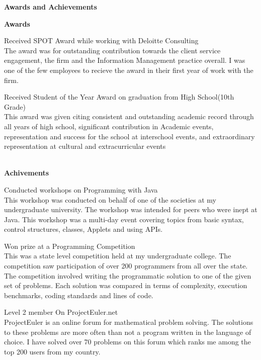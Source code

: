 \documentclass[a4paper,12pt,final]{memoir}
\newcommand{\Sep}{\vspace{1.5em}}
\newcommand{\SmallSep}{\vspace{0.5em}}
\newcommand{\CVSection}[1]
	{\Large\textbf{#1}\par
	\SmallSep\normalsize\normalfont}
\newcommand{\CVItem}[1]
	{\textbf{\color{Plum} #1}}
\begin{document}
\CVSection{Awards and Achievements}
\CVItem{Awards}\SmallSep\\
\begin{minipage}{13.5cm}
	\begin{compactitem}[\color{Plum}$\circ$]
		\footnotesize
			\item Received SPOT Award while working with Deloitte Consulting\\
			{\footnotesize The award was for outstanding contribution towards the client service engagement, the firm and the Information Management practice overall. I was one of the few employees to recieve the award in their first year of work with the firm.}\SmallSep %
			\item Received Student of the Year Award on graduation from High School(10th Grade)\\
			{\footnotesize This award was given citing consistent and outstanding academic record through all years of high school, significant contribution in Academic events, representation and success for the school at interschool events, and extraordinary representation at cultural and extracurricular events} %
	\end{compactitem}
\end{minipage}
\SmallSep\\
\CVItem{Achivements}\SmallSep\\
\begin{minipage}{13.5cm}
	\begin{compactitem}[\color{Plum}$\circ$]
			\item Conducted workshops on Programming with Java\texttrademark\\
			{\footnotesize This workshop was conducted on behalf of one of the societies at my undergraduate university. The workshop was intended for peers who were inept at Java\texttrademark. This workshop was a multi-day event covering topics from basic syntax, control structures, classes, Applets and using APIs.} %
			\item Won prize at a Programming Competition\\
			{\footnotesize This was a state level competition held at my undergraduate college. The competition saw participation of over 200 programmers from all over the state. The competition involved writing the programmatic solution to one of the given set of problems. Each solution was compared in terms of complexity, execution benchmarks, coding standards and lines of code.} %
			\item Level 2 member On ProjectEuler.net\\
			{\footnotesize ProjectEuler is an online forum for mathematical problem solving. The solutions to these problems are more often than not a program written in the language of choice. I have solved over 70 problems on this forum which ranks me among the top 200 users from my country.} %
	\end{compactitem}
\end{minipage}
\Sep\\
\end{document}
